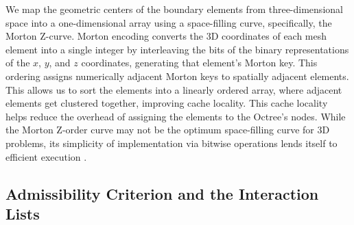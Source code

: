 We map the geometric centers of the boundary elements from three-dimensional space into a one-dimensional array using a space-filling curve, specifically, the Morton Z-curve. Morton encoding converts the 3D coordinates of each mesh element into a single integer by interleaving the bits of the binary representations of the $x$, $y$, and $z$ coordinates, generating that element's Morton key. This ordering assigns numerically adjacent Morton keys to spatially adjacent elements. This allows us to sort the elements into a linearly ordered array,  where adjacent elements get clustered together, improving cache locality. This cache locality helps reduce the overhead of assigning the elements to the Octree's nodes. While the Morton Z-order curve may not be the optimum space-filling curve for 3D problems, its simplicity of implementation via bitwise operations lends itself to efficient execution \cite{malhotrapvfmmparallelkernel2015}.

\subsection{Admissibility Criterion and the Interaction Lists} \label{subsec:interaction-lists}

